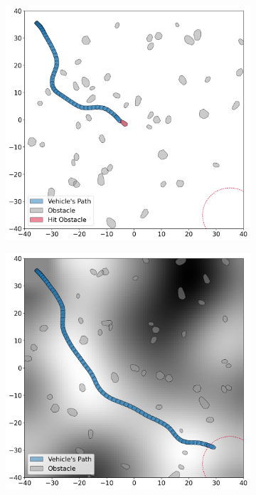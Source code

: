 \begin{figure}[h]
\begin{subfigure}{0.24\textwidth}
        \caption{}
        \label{fig:rigid_flat_9_example22}
    \end{subfigure}
    \hfill
    \begin{subfigure}{0.24\textwidth}
        \includegraphics[height=.12\paperheight]{images/demonstration/rigid_flat_9_failure_example0.png}
        \caption{}
        \label{fig:rigid_flat_9_failure_example0}
    \end{subfigure}
    \hfill
    \begin{subfigure}{0.24\textwidth}
        \includegraphics[height=.12\paperheight]{images/demonstration/rigid_height_map_example13.png}

\end{subfigure}
\end{figure}
